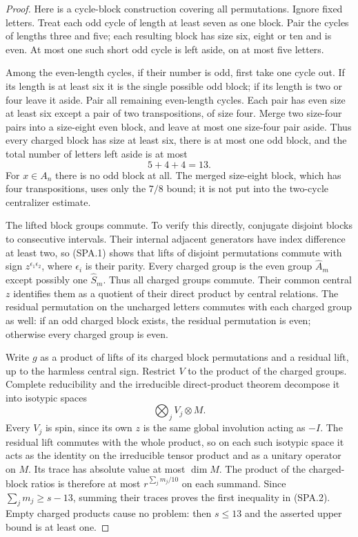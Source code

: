 \begin{proof}
Here is a cycle-block construction covering all permutations.
Ignore fixed letters.  Treat each odd cycle of length at least
seven as one block.  Pair the cycles of lengths three and five;
each resulting block has size six, eight or ten and is even.
At most one such short odd cycle is left aside, on at most five
letters.

Among the even-length cycles, if their number is odd, first take
one cycle out.  If its length is at least six it is the single
possible odd block; if its length is two or four leave it aside.
Pair all remaining even-length cycles.  Each pair has even size
at least six except a pair of two transpositions, of size four.
Merge two size-four pairs into a size-eight even block, and leave
at most one size-four pair aside.  Thus every charged block has
size at least six, there is at most one odd block, and the total
number of letters left aside is at most
\[
                         5+4+4=13.
 \tag{SPA.6}
\]
For $x\in A_n$ there is no odd block at all.  The merged
size-eight block, which has four transpositions, uses only the
$7/8$ bound; it is not put into the two-cycle centralizer estimate.

The lifted block groups commute.  To verify this directly,
conjugate disjoint blocks to consecutive intervals.  Their internal
adjacent generators have index difference at least two, so (SPA.1)
shows that lifts of disjoint permutations commute with sign
$z^{\epsilon_1\epsilon_2}$, where $\epsilon_i$ is their parity.
Every charged group is the even group $\widehat A_m$ except
possibly one $\widehat S_m$.  Thus all charged groups commute.
Their common central $z$ identifies them as a quotient of their
direct product by central relations.  The residual permutation
on the uncharged letters commutes with each charged group as
well: if an odd charged block exists, the residual permutation
is even; otherwise every charged group is even.

Write $g$ as a product of lifts of its charged block permutations
and a residual lift, up to the harmless central sign.  Restrict
$V$ to the product of the charged groups.  Complete reducibility
and the irreducible direct-product theorem decompose it into
isotypic spaces
\[
                   \bigotimes_j V_j\otimes M.
 \tag{SPA.7}
\]
Every $V_j$ is spin, since its own $z$ is the same global
involution acting as $-I$.  The residual lift commutes with the
whole product, so on each such isotypic space it acts as the
identity on the irreducible tensor product and as a unitary
operator on $M$.  Its trace has absolute value at most $\dim M$.
The product of the charged-block ratios is therefore at most
$r^{\sum_j m_j/10}$ on each summand.  Since
$\sum_jm_j\ge s-13$, summing their traces proves the first
inequality in (SPA.2).  Empty charged products cause no problem:
then $s\le13$ and the asserted upper bound is at least one.
\end{proof}

